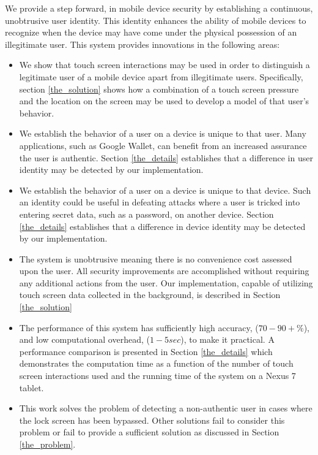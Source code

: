 We provide a step forward, 
%
in mobile device security by
establishing a continuous, unobtrusive user identity.
%
This identity
enhances the ability of mobile devices to
recognize when the 
device may have come under
the physical possession of an illegitimate user.
%
This system provides innovations in the following areas:
\begin{itemize}
\item We show that touch screen interactions may be used in order to
  distinguish a legitimate user of a mobile device apart from
  illegitimate users.
  Specifically, section
  \ref{the_solution} %
  shows how a combination of 
  a touch screen pressure and 
  the location on the screen
  may be used to develop a model of that user's behavior.
\item We establish the behavior of a user on a device
  is unique to that user.
  Many applications, such as Google Wallet,
  can benefit from an increased
  assurance the user is authentic.
  Section 
  \ref{the_details} %
  establishes that a difference in user identity
  may be detected by our implementation.
\item We establish the behavior of a user on a device
  is unique to that device.
  Such an identity could be useful in defeating
  attacks where a user is tricked into entering
  secret data, such as a password,
  on another device.
  Section 
  \ref{the_details} %
  establishes that a difference in device identity
  may be detected by our implementation.
\item The system is unobtrusive meaning there is no convenience cost assessed upon the user.
  All security improvements are accomplished without requiring any additional
  actions from the user.
  Our implementation,
  capable of utilizing touch screen data collected in the background, 
  is described in
  Section
  \ref{the_solution} %
\item The performance of this system 
  has sufficiently high accuracy, ($70-90+\%$), and
  low computational overhead, ($1-5 sec$),
  to make it practical.
  A performance comparison is presented in Section
  \ref{the_details} %
  which demonstrates 
  the computation time as a function of
  the number of touch screen interactions used and
  the running time of the system on a Nexus 7 tablet.
\item This work solves the problem of
  detecting a non-authentic user
  in cases where the lock screen has been bypassed. %
  Other solutions fail to consider this problem
  or fail to provide a sufficient solution
  as discussed in Section
  \ref{the_problem}.
\end{itemize}

